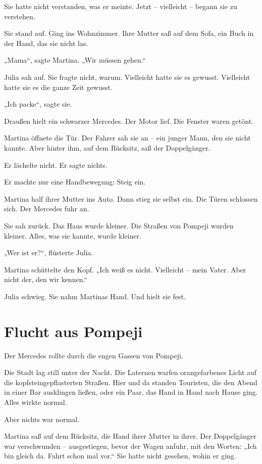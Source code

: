 \documentclass[
]{article}
\begin{document}
Sie hatte nicht verstanden, was er meinte. Jetzt -- vielleicht -- begann sie zu verstehen.

Sie stand auf. Ging ins Wohnzimmer. Ihre Mutter saß auf dem Sofa, ein Buch in der Hand, das sie nicht las.

„Mama``, sagte Martina. „Wir müssen gehen.``

Julia sah auf. Sie fragte nicht, warum. Vielleicht hatte sie es gewusst. Vielleicht hatte sie es die ganze Zeit gewusst.

„Ich packe``, sagte sie.

Draußen hielt ein schwarzer Mercedes. Der Motor lief. Die Fenster waren getönt.

Martina öffnete die Tür. Der Fahrer sah sie an -- ein junger Mann, den sie nicht kannte. Aber hinter ihm, auf dem Rücksitz, saß der Doppelgänger.

Er lächelte nicht. Er sagte nichts.

Er machte nur eine Handbewegung: Steig ein.

Martina half ihrer Mutter ins Auto. Dann stieg sie selbst ein. Die Türen schlossen sich. Der Mercedes fuhr an.

Sie sah zurück. Das Haus wurde kleiner. Die Straßen von Pompeji wurden kleiner. Alles, was sie kannte, wurde kleiner.

„Wer ist er?{\kern0pt}``, flüsterte Julia.

Martina schüttelte den Kopf. „Ich weiß es nicht. Vielleicht -- mein Vater. Aber nicht der, den wir kennen.``

Julia schwieg. Sie nahm Martinas Hand. Und hielt sie fest.

\section{Flucht aus Pompeji}\label{flucht-aus-pompeji}

Der Mercedes rollte durch die engen Gassen von Pompeji.

Die Stadt lag still unter der Nacht. Die Laternen warfen orangefarbenes Licht auf die kopfsteingepflasterten Straßen. Hier und da standen Touristen, die den Abend in einer Bar ausklingen ließen, oder ein Paar, das Hand in Hand nach Hause ging. Alles wirkte normal.

Aber nichts war normal.

Martina saß auf dem Rücksitz, die Hand ihrer Mutter in ihrer. Der Doppelgänger war verschwunden -- ausgestiegen, bevor der Wagen anfuhr, mit den Worten: „Ich bin gleich da. Fahrt schon mal vor.`` Sie hatte nicht gesehen, wohin er ging.
\end{document}
